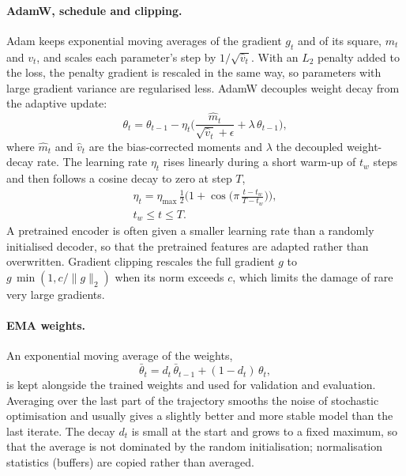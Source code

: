\paragraph{AdamW, schedule and clipping.} Adam keeps exponential moving averages of the gradient $g_t$ and of its square, $m_t$ and $v_t$, and
scales each parameter's step by $1/\sqrt{\hat v_t}$. With an $L_2$ penalty added to the loss, the penalty gradient is rescaled in the same way, so
parameters with large gradient variance are regularised less. AdamW \citep{loshchilov2019adamw} decouples weight decay from the adaptive update:
\begin{equation}
\theta_t=\theta_{t-1}-\eta_t\Big(\frac{\hat m_t}{\sqrt{\hat v_t}+\epsilon}+\lambda\,\theta_{t-1}\Big),
\label{eq:bg_adamw}
\end{equation}
where $\hat m_t$ and $\hat v_t$ are the bias-corrected moments and $\lambda$ the decoupled weight-decay rate. The learning rate $\eta_t$ rises
linearly during a short warm-up of $t_w$ steps and then follows a cosine decay to zero at step $T$,
\begin{equation}
\begin{gathered}
\eta_t=\eta_{\max}\,\tfrac12\Big(1+\cos\Big(\pi\,\frac{t-t_w}{T-t_w}\Big)\Big),\\
t_w\le t\le T .
\end{gathered}
\label{eq:bg_cosine}
\end{equation}
A pretrained encoder is often given a smaller learning rate than a randomly initialised decoder, so that the pretrained features are adapted
rather than overwritten. Gradient clipping rescales the full gradient $g$ to $g\,\min(1,c/\lVert g\rVert_2)$ when its norm exceeds $c$, which
limits the damage of rare very large gradients.

\paragraph{EMA weights.} An exponential moving average of the weights,
\begin{equation}
\bar\theta_t=d_t\,\bar\theta_{t-1}+(1-d_t)\,\theta_t ,
\label{eq:bg_ema}
\end{equation}
is kept alongside the trained weights and used for validation and evaluation. Averaging over the last part of the trajectory smooths the noise of
stochastic optimisation and usually gives a slightly better and more stable model than the last iterate. The decay $d_t$ is small at the start and
grows to a fixed maximum, so that the average is not dominated by the random initialisation; normalisation statistics (buffers) are copied rather
than averaged.

